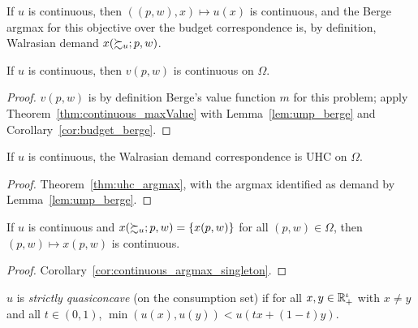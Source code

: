 \begin{lemma}
\label{lem:ump_berge}
\leanok
{}
If $u$ is continuous, then $((p, w), x) \mapsto u(x)$ is continuous, and the Berge argmax for this
objective over the budget correspondence is, by definition, Walrasian demand $x(\succsim_u; p, w)$.
\end{lemma}

\begin{theorem}
\label{thm:continuous_v}
\leanok
{}
If $u$ is continuous, then $v(p, w)$ is continuous on $\Omega$.
\end{theorem}
\begin{proof}
\leanok
$v(p, w)$ is by definition Berge's value function $m$ for this problem; apply
Theorem~\ref{thm:continuous_maxValue} with Lemma~\ref{lem:ump_berge} and Corollary~\ref{cor:budget_berge}.
\end{proof}

\begin{theorem}
\label{thm:uhc_demand}
\leanok
{}
If $u$ is continuous, the Walrasian demand correspondence is UHC on $\Omega$.
\end{theorem}
\begin{proof}
\leanok
Theorem~\ref{thm:uhc_argmax}, with the argmax identified as demand by Lemma~\ref{lem:ump_berge}.
\end{proof}

\begin{theorem}
\label{thm:continuous_demand_function}
\leanok
{}
If $u$ is continuous and $x(\succsim_u; p, w) = \{x(p, w)\}$ for all $(p, w) \in \Omega$, then
$(p, w) \mapsto x(p, w)$ is continuous.
\end{theorem}
\begin{proof}
\leanok
Corollary~\ref{cor:continuous_argmax_singleton}.
\end{proof}

\begin{definition}
\label{def:strictlyQuasiconcave}
\leanok
$u$ is \emph{strictly quasiconcave} (on the consumption set) if for all
$x, y \in \mathbb{R}^\iota_+$ with $x \neq y$ and all $t \in (0, 1)$,
$\min(u(x), u(y)) < u(t x + (1-t) y)$.
\end{definition}


